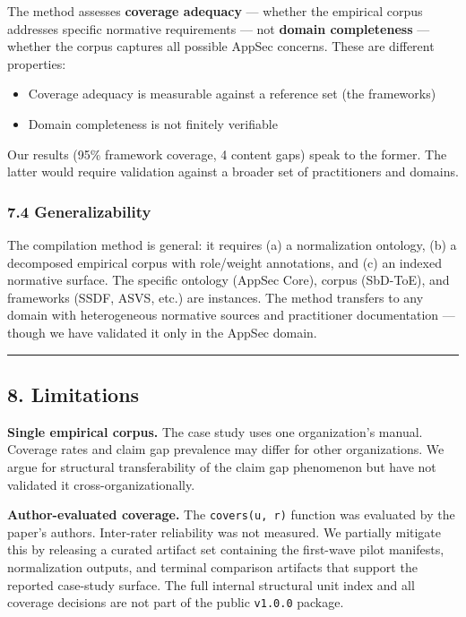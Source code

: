 \documentclass[
]{article}
\providecommand{\tightlist}{%
  \setlength{\itemsep}{0pt}\setlength{\parskip}{0pt}}
\begin{document}
The method assesses \textbf{coverage adequacy} --- whether the empirical
corpus addresses specific normative requirements --- not \textbf{domain
completeness} --- whether the corpus captures all possible AppSec
concerns. These are different properties:

\begin{itemize}
\tightlist
\item
  Coverage adequacy is measurable against a reference set (the
  frameworks)
\item
  Domain completeness is not finitely verifiable
\end{itemize}

Our results (95\% framework coverage, 4 content gaps) speak to the
former. The latter would require validation against a broader set of
practitioners and domains.

\subsubsection{7.4 Generalizability}\label{generalizability}

The compilation method is general: it requires (a) a normalization
ontology, (b) a decomposed empirical corpus with role/weight
annotations, and (c) an indexed normative surface. The specific ontology
(AppSec Core), corpus (SbD-ToE), and frameworks (SSDF, ASVS, etc.) are
instances. The method transfers to any domain with heterogeneous
normative sources and practitioner documentation --- though we have
validated it only in the AppSec domain.

\begin{center}\rule{0.5\linewidth}{0.5pt}\end{center}

\subsection{8. Limitations}\label{limitations}

\textbf{Single empirical corpus.} The case study uses one organization's
manual. Coverage rates and claim gap prevalence may differ for other
organizations. We argue for structural transferability of the claim gap
phenomenon but have not validated it cross-organizationally.

\textbf{Author-evaluated coverage.} The \texttt{covers(u,\ r)} function
was evaluated by the paper's authors. Inter-rater reliability was not
measured. We partially mitigate this by releasing a curated artifact set
containing the first-wave pilot manifests, normalization outputs, and
terminal comparison artifacts that support the reported case-study
surface. The full internal structural unit index and all coverage
decisions are not part of the public \texttt{v1.0.0} package.
\end{document}

